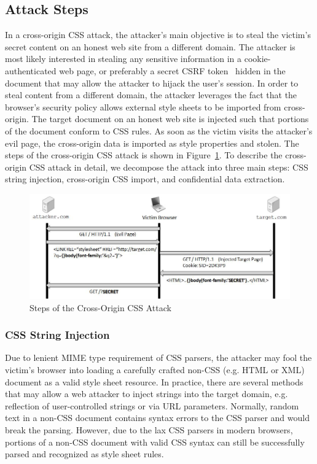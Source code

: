 \documentclass{acm_proc_article-sp}
\begin{document}
\subsection{Attack Steps}
In a cross-origin CSS attack, the attacker's main objective is to steal the victim's secret content on an honest web site from a different domain. The attacker is most likely interested in stealing any sensitive information in a cookie-authenticated web page, or preferably a secret CSRF token~\cite{csrf} hidden in the document that may allow the attacker to hijack the user's session. In order to steal content from a different domain, the attacker leverages the fact that the browser's security policy allows external style sheets to be imported from cross-origin. The target document on an honest web site is injected such that portions of the document conform to CSS rules. As soon as the victim visits the attacker's evil page, the cross-origin data is imported as style properties and stolen. The steps of the cross-origin CSS attack is shown in Figure~\ref{figure:steps}. To describe the cross-origin CSS attack in detail, we decompose the attack into three main steps: CSS string injection, cross-origin CSS import, and confidential data extraction.

\begin{figure}
\centering
\includegraphics[width=\linewidth]{steps.jpg}
\caption{Steps of the Cross-Origin CSS Attack}
\label{figure:steps}
\end{figure}

\subsubsection{CSS String Injection}
Due to lenient MIME type requirement of CSS parsers, the attacker may fool the victim's browser into loading a carefully crafted non-CSS (e.g. HTML or XML) document as a valid style sheet resource. In practice, there are several methods that may allow a web attacker to inject strings into the target domain, e.g. reflection of user-controlled strings or via URL parameters. Normally, random text in a non-CSS document contains syntax errors to the CSS parser and would break the parsing. However, due to the lax CSS parsers in modern browsers, portions of a non-CSS document with valid CSS syntax can still be successfully parsed and recognized as style sheet rules.
\end{document}
